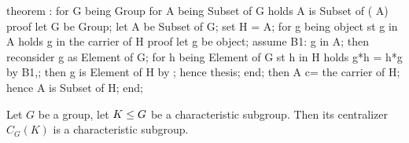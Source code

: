 \nwenddocs{}\endmoddef\nwstartdeflinemarkup{}\nwenddeflinemarkup
theorem :
  for G being Group
  for A being Subset of G
  holds A is Subset of  ( A)
proof
  let G be Group;
  let A be Subset of G;
  set H =  A;
  for g being object
  st g in A
  holds g in the carrier of  H
  proof
    let g be object;
    assume B1: g in A;
    then reconsider g as Element of G;
    for h being Element of G st h in H
    holds g*h = h*g by B1,;
    then g is Element of  H by ;
    hence thesis;
  end;
  then A c= the carrier of  H;
  hence A is Subset of  H;
end;
\eatline
{}\nwendcode{}\nwdocspar
\begin{theorem}\label{thm:characteristic:centralizer:centralizer-of-char-group-is-char}
  Let $G$ be a group, let $K\leq G$ be a characteristic subgroup.
  Then its centralizer $C_{G}(K)$ is a characteristic subgroup.
\end{theorem}

